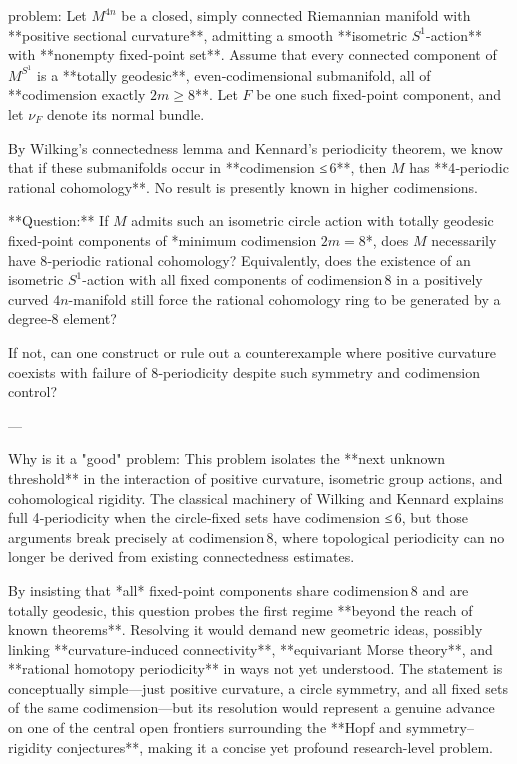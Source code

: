 problem:  
Let \( M^{4n} \) be a closed, simply connected Riemannian manifold with **positive sectional curvature**, admitting a smooth **isometric \(S^1\)-action** with **nonempty fixed-point set**.  
Assume that every connected component of \(M^{S^1}\) is a **totally geodesic**, even‑codimensional submanifold, all of **codimension exactly \(2m \ge 8\)**.  
Let \(F\) be one such fixed-point component, and let \(\nu_F\) denote its normal bundle.  

By Wilking’s connectedness lemma and Kennard’s periodicity theorem, we know that if these submanifolds occur in **codimension ≤ 6**, then \(M\) has **4‑periodic rational cohomology**. No result is presently known in higher codimensions.

**Question:**  
If \(M\) admits such an isometric circle action with totally geodesic fixed‑point components of *minimum codimension \(2m = 8\)*, does \(M\) necessarily have 8‑periodic rational cohomology?  
Equivalently, does the existence of an isometric \(S^1\)-action with all fixed components of codimension 8 in a positively curved \(4n\)-manifold still force the rational cohomology ring to be generated by a degree‑8 element?  

If not, can one construct or rule out a counterexample where positive curvature coexists with failure of 8‑periodicity despite such symmetry and codimension control?

---

Why is it a "good" problem:  
This problem isolates the **next unknown threshold** in the interaction of positive curvature, isometric group actions, and cohomological rigidity.  
The classical machinery of Wilking and Kennard explains full 4‑periodicity when the circle‑fixed sets have codimension ≤ 6, but those arguments break precisely at codimension 8, where topological periodicity can no longer be derived from existing connectedness estimates.  

By insisting that *all* fixed-point components share codimension 8 and are totally geodesic, this question probes the first regime **beyond the reach of known theorems**. Resolving it would demand new geometric ideas, possibly linking **curvature‑induced connectivity**, **equivariant Morse theory**, and **rational homotopy periodicity** in ways not yet understood.  
The statement is conceptually simple—just positive curvature, a circle symmetry, and all fixed sets of the same codimension—but its resolution would represent a genuine advance on one of the central open frontiers surrounding the **Hopf and symmetry–rigidity conjectures**, making it a concise yet profound research-level problem.